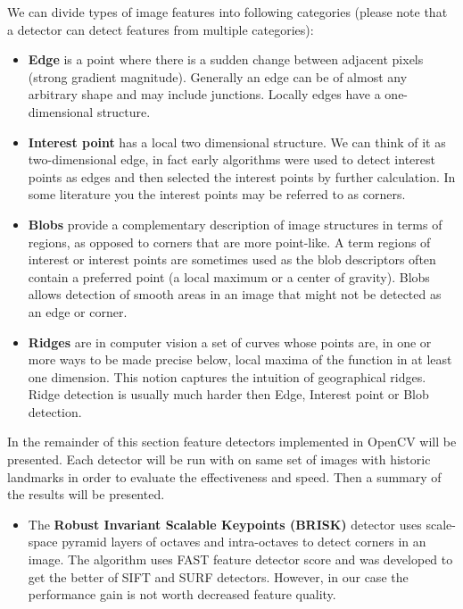 We can divide types of image features into following categories (please note that a detector can detect features from multiple categories):
\begin{itemize}
	\item \textbf{Edge} is a point where there is a sudden change between adjacent pixels (strong gradient magnitude). Generally an edge can be of almost any arbitrary shape and may include junctions. Locally edges have a one-dimensional structure.
	\item \textbf{Interest point} has a local two dimensional structure. We can think of it as two-dimensional edge, in fact early algorithms were used to detect interest points as edges and then selected the interest points by further calculation. In some literature you the interest points may be referred to as corners.
	\item \textbf{Blobs} provide a complementary description of image structures in terms of regions, as opposed to corners that are more point-like. A term regions of interest or interest points are sometimes used as the blob descriptors often contain a preferred point (a local maximum or a center of gravity). Blobs allows detection of smooth areas in an image that might not be detected as an edge or corner.
	\item \textbf{Ridges} are in computer vision a set of curves whose points are, in one or more ways to be made precise below, local maxima of the function in at least one dimension. This notion captures the intuition of geographical ridges. Ridge detection is usually much harder then Edge, Interest point or Blob detection.
\end{itemize}

In the remainder of this section feature detectors implemented in OpenCV will be presented. Each detector will be run with on same set of images with historic landmarks in order to evaluate the effectiveness and speed. Then a summary of the results will be presented.
 
\begin{itemize}
	\item The \textbf{Robust Invariant Scalable Keypoints (BRISK)} detector uses scale-space pyramid layers of octaves and intra-octaves to detect corners in an image. The algorithm uses FAST feature detector score and was developed to get the better of SIFT and SURF detectors. However, in our case the performance gain is not worth decreased feature quality. \cite{article:brisk}
\end{itemize} 

